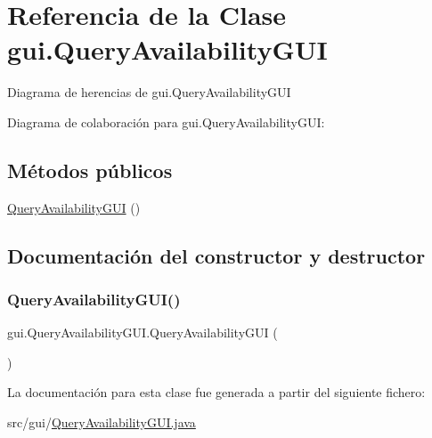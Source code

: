\hypertarget{classgui_1_1_query_availability_g_u_i}{}\section{Referencia de la Clase gui.\+Query\+Availability\+G\+UI}
\label{classgui_1_1_query_availability_g_u_i}


Diagrama de herencias de gui.\+Query\+Availability\+G\+UI


Diagrama de colaboración para gui.\+Query\+Availability\+G\+UI\+:
\subsection*{Métodos públicos}
\begin{DoxyCompactItemize}
\item 
\mbox{\hyperlink{classgui_1_1_query_availability_g_u_i_a098dc51a0df6dd658bdd9a70231cbe3b}{Query\+Availability\+G\+UI}} ()
\end{DoxyCompactItemize}


\subsection{Documentación del constructor y destructor}
\mbox{\label{classgui_1_1_query_availability_g_u_i_a098dc51a0df6dd658bdd9a70231cbe3b}} 
\subsubsection{\texorpdfstring{QueryAvailabilityGUI()}{QueryAvailabilityGUI()}}
{\footnotesize\ttfamily gui.\+Query\+Availability\+G\+U\+I.\+Query\+Availability\+G\+UI (\begin{DoxyParamCaption}{ }\end{DoxyParamCaption})}



La documentación para esta clase fue generada a partir del siguiente fichero\+:\begin{DoxyCompactItemize}
\item 
src/gui/\mbox{\hyperlink{_query_availability_g_u_i_8java}{Query\+Availability\+G\+U\+I.\+java}}\end{DoxyCompactItemize}

